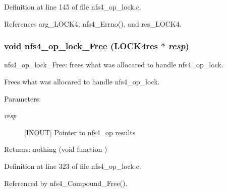 Definition at line 145 of file nfs4\_\-op\_\-lock.c.

References arg\_\-LOCK4, nfs4\_\-Errno(), and res\_\-LOCK4.
\subsubsection{\setlength{\rightskip}{0pt plus 5cm}void nfs4\_\-op\_\-lock\_\-Free (LOCK4res $\ast$ {\em resp})}\label{nfs4__op__lock_8c_a3}


nfs4\_\-op\_\-lock\_\-Free: frees what was allocared to handle nfs4\_\-op\_\-lock.

Frees what was allocared to handle nfs4\_\-op\_\-lock.

\begin{Desc}
\item[Parameters:]
\begin{description}
\item[{\em resp}][INOUT] Pointer to nfs4\_\-op results\end{description}
\end{Desc}
\begin{Desc}
\item[Returns:]nothing (void function ) \end{Desc}


Definition at line 323 of file nfs4\_\-op\_\-lock.c.

Referenced by nfs4\_\-Compound\_\-Free().